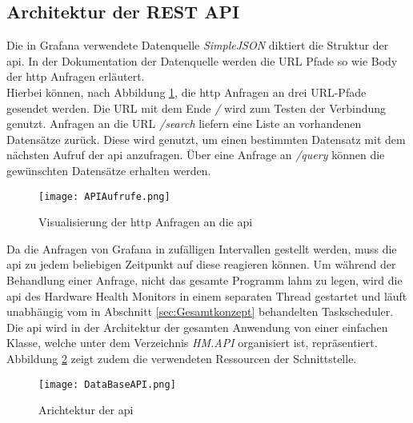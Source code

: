 \subsection{Architektur der REST API}
Die in Grafana verwendete Datenquelle \textit{SimpleJSON} diktiert die Struktur der \ac{api}. In der Dokumentation der Datenquelle \cite{SimpleJSON} werden die URL Pfade so wie Body der \acs{http} Anfragen erläutert.\\
Hierbei können, nach Abbildung \ref{fig:APIAnfragen}, die \ac{http} Anfragen an drei URL-Pfade gesendet werden. Die URL mit dem Ende \glqq\textit{/}\grqq{} wird zum Testen der Verbindung genutzt. Anfragen an die URL \glqq\textit{/search}\grqq{} liefern eine Liste an vorhandenen Datensätze zurück. Diese wird genutzt, um einen bestimmten Datensatz mit dem nächsten Aufruf der \ac{api} anzufragen. Über eine Anfrage an \glqq\textit{/query}\grqq{} können die gewünschten Datensätze erhalten werden.\\
\begin{center}
    \begin{figure}[h!]
        \captionsetup{justification=centering,format=plain, font=small}
        \centering
        \texttt{[image: APIAufrufe.png]}
        \caption{Visualisierung der \ac{http} Anfragen an die \ac{api}}
        \label{fig:APIAnfragen}
    \end{figure}
\end{center}
\vspace{-1.8cm}
Da die Anfragen von Grafana in zufälligen Intervallen gestellt werden, muss die \ac{api} zu jedem beliebigen Zeitpunkt auf diese reagieren können. Um während der Behandlung einer Anfrage, nicht das gesamte Programm lahm zu legen, wird die \ac{api} des Hardware Health Monitors in einem separaten Thread gestartet und läuft unabhängig vom in Abschnitt \ref{sec:Gesamtkonzept} behandelten Taskscheduler.\\
Die \ac{api} wird in der Architektur der gesamten Anwendung von einer einfachen Klasse, welche unter dem Verzeichnis \textit{HM.API} organisiert ist, repräsentiert. Abbildung \ref{fig:UMLAPI} zeigt zudem die verwendeten Ressourcen der Schnittstelle. 
\begin{center}
    \begin{figure}[h!]
        \centering
        \texttt{[image: DataBaseAPI.png]}
        \caption{Arichtektur der \ac{api}}
        \label{fig:UMLAPI}
    \end{figure}
\end{center}
\vspace{-1.8cm}